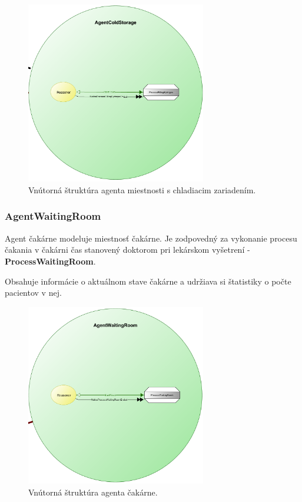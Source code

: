 \documentclass[letterpaper]{article}
\begin{document}
	\begin{figure}[hbt!]
		\centering
		\includegraphics[width=0.7\textwidth]{src/AgentColdStorage}
		\caption{Vnútorná štruktúra agenta miestnosti s chladiacim zariadením.}
	\end{figure}
	
	\newpage
	
	\subsubsection{AgentWaitingRoom}
	
	Agent čakárne modeluje miestnosť čakárne. Je zodpovedný za vykonanie procesu čakania v čakárni čas stanovený doktorom pri lekárskom vyšetrení - \textbf{ProcessWaitingRoom}.
	
	Obsahuje informácie o aktuálnom stave čakárne a udržiava si štatistiky o počte pacientov v nej.
	
	\vspace{0.8cm}
	
	\begin{figure}[hbt!]
		\centering
		\includegraphics[width=0.7\textwidth]{src/AgentWaitingRoom}
		\caption{Vnútorná štruktúra agenta čakárne.}
	\end{figure}
	
\end{document}
